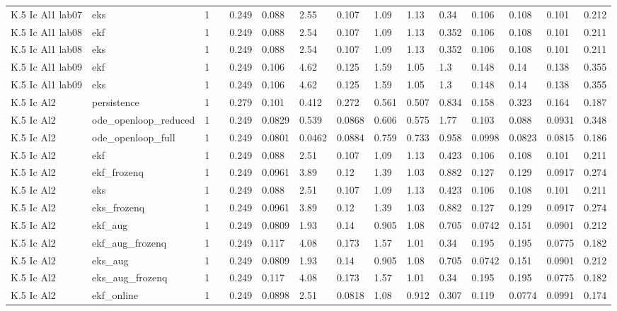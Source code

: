 \begin{table}[t]
\begin{tabular}{lllllllllllllll}
K.5 Ic Al1 lab07 & eks & 1 &  & 0.249 & 0.088 & 2.55 & 0.107 & 1.09 & 1.13 & 0.34 & 0.106 & 0.108 & 0.101 & 0.212 \\
K.5 Ic Al1 lab08 & ekf & 1 &  & 0.249 & 0.088 & 2.54 & 0.107 & 1.09 & 1.13 & 0.352 & 0.106 & 0.108 & 0.101 & 0.211 \\
K.5 Ic Al1 lab08 & eks & 1 &  & 0.249 & 0.088 & 2.54 & 0.107 & 1.09 & 1.13 & 0.352 & 0.106 & 0.108 & 0.101 & 0.211 \\
K.5 Ic Al1 lab09 & ekf & 1 &  & 0.249 & 0.106 & 4.62 & 0.125 & 1.59 & 1.05 & 1.3 & 0.148 & 0.14 & 0.138 & 0.355 \\
K.5 Ic Al1 lab09 & eks & 1 &  & 0.249 & 0.106 & 4.62 & 0.125 & 1.59 & 1.05 & 1.3 & 0.148 & 0.14 & 0.138 & 0.355 \\
K.5 Ic Al2 & persistence & 1 &  & 0.279 & 0.101 & 0.412 & 0.272 & 0.561 & 0.507 & 0.834 & 0.158 & 0.323 & 0.164 & 0.187 \\
K.5 Ic Al2 & ode\_openloop\_reduced & 1 &  & 0.249 & 0.0829 & 0.539 & 0.0868 & 0.606 & 0.575 & 1.77 & 0.103 & 0.088 & 0.0931 & 0.348 \\
K.5 Ic Al2 & ode\_openloop\_full & 1 &  & 0.249 & 0.0801 & 0.0462 & 0.0884 & 0.759 & 0.733 & 0.958 & 0.0998 & 0.0823 & 0.0815 & 0.186 \\
K.5 Ic Al2 & ekf & 1 &  & 0.249 & 0.088 & 2.51 & 0.107 & 1.09 & 1.13 & 0.423 & 0.106 & 0.108 & 0.101 & 0.211 \\
K.5 Ic Al2 & ekf\_frozenq & 1 &  & 0.249 & 0.0961 & 3.89 & 0.12 & 1.39 & 1.03 & 0.882 & 0.127 & 0.129 & 0.0917 & 0.274 \\
K.5 Ic Al2 & eks & 1 &  & 0.249 & 0.088 & 2.51 & 0.107 & 1.09 & 1.13 & 0.423 & 0.106 & 0.108 & 0.101 & 0.211 \\
K.5 Ic Al2 & eks\_frozenq & 1 &  & 0.249 & 0.0961 & 3.89 & 0.12 & 1.39 & 1.03 & 0.882 & 0.127 & 0.129 & 0.0917 & 0.274 \\
K.5 Ic Al2 & ekf\_aug & 1 &  & 0.249 & 0.0809 & 1.93 & 0.14 & 0.905 & 1.08 & 0.705 & 0.0742 & 0.151 & 0.0901 & 0.212 \\
K.5 Ic Al2 & ekf\_aug\_frozenq & 1 &  & 0.249 & 0.117 & 4.08 & 0.173 & 1.57 & 1.01 & 0.34 & 0.195 & 0.195 & 0.0775 & 0.182 \\
K.5 Ic Al2 & eks\_aug & 1 &  & 0.249 & 0.0809 & 1.93 & 0.14 & 0.905 & 1.08 & 0.705 & 0.0742 & 0.151 & 0.0901 & 0.212 \\
K.5 Ic Al2 & eks\_aug\_frozenq & 1 &  & 0.249 & 0.117 & 4.08 & 0.173 & 1.57 & 1.01 & 0.34 & 0.195 & 0.195 & 0.0775 & 0.182 \\
K.5 Ic Al2 & ekf\_online & 1 &  & 0.249 & 0.0898 & 2.51 & 0.0818 & 1.08 & 0.912 & 0.307 & 0.119 & 0.0774 & 0.0991 & 0.174 \\

\end{tabular}
\end{table}
